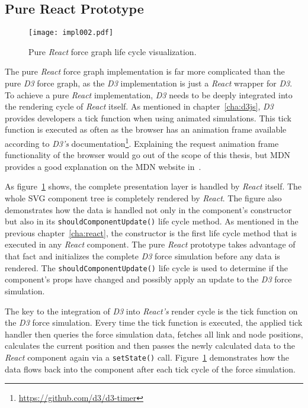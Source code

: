 \subsection{Pure React Prototype}
\label{sec:pureReactPrototype}

\begin{figure}
\centering
\texttt{[image: impl002.pdf]}
\caption{Pure \emph{React} force graph life cycle visualization.}
\label{fig:pureReactLifecycle}
\end{figure}

The pure \emph{React} force graph implementation is far more complicated than the pure \emph{D3} force graph, as the \emph{D3} implementation is just a \emph{React} wrapper for \emph{D3}. To achieve a pure \emph{React} implementation, \emph{D3} needs to be deeply integrated into the rendering cycle of \emph{React} itself. As mentioned in chapter~\ref{cha:d3js}, \emph{D3} provides developers a tick function when using animated simulations. This tick function is executed as often as the browser has an animation frame available according to \emph{D3's} documentation\footnote{\url{https://github.com/d3/d3-timer}}. Explaining the request animation frame functionality of the browser would go out of the scope of this thesis, but MDN provides a good explanation on the MDN website in~\cite{RAF}.

As figure~\ref{fig:pureReactLifecycle} shows, the complete presentation layer is handled by \emph{React} itself. The whole SVG component tree is completely rendered by \emph{React}. The figure also demonstrates how the data is handled not only in the component's constructor but also in its \texttt{shouldComponentUpdate()} life cycle method. As mentioned in the previous chapter~\ref{cha:react}, the constructor is the first life cycle method that is executed in any \emph{React} component. The pure \emph{React} prototype takes advantage of that fact and initializes the complete \emph{D3} force simulation before any data is rendered. The \texttt{shouldComponentUpdate()} life cycle is used to determine if the component's props have changed and possibly apply an update to the \emph{D3} force simulation.

The key to the integration of \emph{D3} into \emph{React's} render cycle is the tick function on the \emph{D3} force simulation. Every time the tick function is executed, the applied tick handler then queries the force simulation data, fetches all link and node positions, calculates the current position and then passes the newly calculated data to the \emph{React} component again via a \texttt{setState()} call. Figure~\ref{fig:pureReactLifecycle} demonstrates how the data flows back into the component after each tick cycle of the force simulation.

